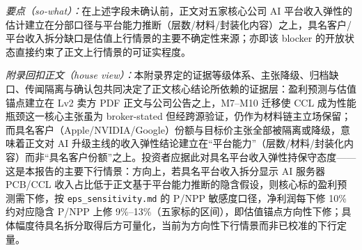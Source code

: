 \noindent\textit{要点（so-what）：}在上述字段未确认前，正文对五家核心公司 AI 平台收入弹性的估计建立在分部口径与平台能力推断（层数/材料/封装化内容）之上，具名客户/平台收入拆分缺口是估值上行情景的主要不确定性来源；亦即该 blocker 的开放状态直接约束了正文上行情景的可证实程度。

\noindent\textit{附录回扣正文（house view）：}本附录界定的证据等级体系、主张降级、归档缺口、传闻隔离与确认包共同决定了正文核心结论所依赖的证据层：盈利预测与估值锚点建立在 Lv2 卖方 PDF 正文与公司公告之上，M7--M10 迁移使 CCL 成为性能瓶颈这一核心主张虽为 broker-stated 但经跨源验证，仍作为材料链主立场保留；而具名客户（Apple/NVIDIA/Google）份额与目标价主张全部被隔离或降级，意味着正文对 AI 升级主线的收入弹性结论建立在``平台能力''（层数/材料/封装化内容）而非``具名客户份额''之上。投资者应据此对具名平台收入弹性持保守态度——这是本报告的主要下行情景：方向上，若具名平台收入拆分显示 AI 服务器 PCB/CCL 收入占比低于正文基于平台能力推断的隐含假设，则核心标的盈利预测需下修，按 \texttt{eps\_sensitivity.md} 的 P/NPP 敏感度口径，净利润每下修 10\% 约对应隐含 P/NPP 上修 9\%--13\%（五家标的区间），即估值锚点方向性下修；具体幅度待具名拆分取得后方可量化，当前为方向性下行情景而非已校准的下行定量。
